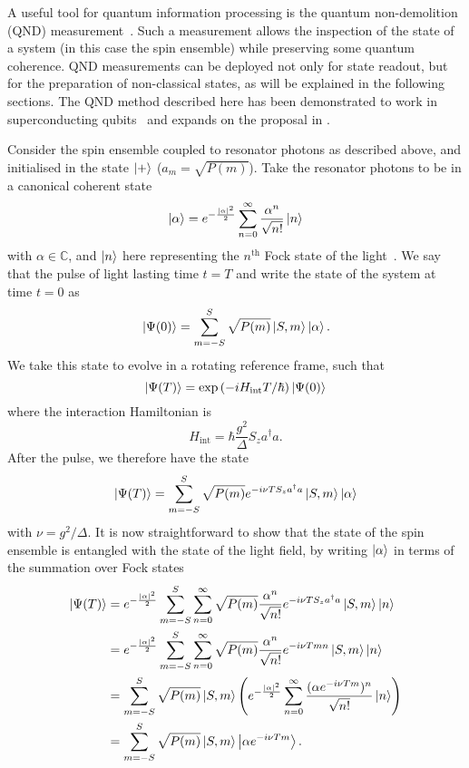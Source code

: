 A useful tool for quantum information processing is the quantum non-demolition
(QND) measurement~\cite{}. Such a measurement allows the inspection of the
state of a system (in this case the spin ensemble) while preserving some
quantum coherence. QND measurements can be deployed not only for state readout,
but for the preparation of non-classical states, as will be explained in the
following sections. The QND method described here has been demonstrated to work
in superconducting qubits~\cite{PhysRevA.69.062320} and expands on the proposal
in \cite{Andre2006}.

Consider the spin ensemble coupled to resonator photons as described above, and
initialised in the state $\ket{+}$ ($a_m = \sqrt{P(m)}$). Take the resonator
photons to be in a canonical coherent state~\cite{Gazeau2009}
%
\begin{equation}
  \ket{\alpha} = e^{-\frac{|\alpha|^2}{2}}\sum_{n=0}^\infty \frac{\alpha^n}{\sqrt{n!}} \ket{n}
\end{equation}
%
with $\alpha\in\mathbb{C}$, and $\ket{n}$ here representing the $n^\text{th}$
Fock state of the light~\cite{agarwal2012}. We say that the pulse of light lasting time
$t=T$ and  write the state of the system at time $t=0$ as
%
\begin{equation}
  \ket{\Psi(0)} = \sum_{m=-S}^S \sqrt{P(m)} \ket{S, m}\ket{\alpha}.
\end{equation}
%
We take this state to evolve in a rotating reference frame, such that
%
\begin{equation}
  \ket{\Psi(T)} = \exp\left(-iH_\text{int}T/\hbar\right)\ket{\Psi(0)}
\end{equation}
%
where the interaction Hamiltonian is
%
\begin{equation}
  H_\text{int} = \hbar \frac{g^2}{\Delta} S_z a^\dagger a.
\end{equation}
%
After the pulse, we therefore have the state
%
\begin{equation}
  \ket{\Psi(T)} = \sum_{m=-S}^S \sqrt{P(m)} e^{-i\nu T S_z
  a^\dagger a} \ket{S, m}\ket{\alpha}
\end{equation}
%
with $\nu = g^2/\Delta$. It is now straightforward to show that
the state of the spin ensemble is entangled with the state of the light field,
by writing $\ket{\alpha}$ in terms of the summation over Fock states
%
\begin{align}
  \ket{\Psi(T)} &= e^{-\frac{|\alpha|^2}{2}}\sum_{m=-S}^S \sum_{n=0}^\infty \sqrt{P(m)}
   \frac{\alpha^n}{\sqrt{n!}} e^{-i\nu T S_z a^\dagger a} \ket{S, m} \ket{n}
   \\
  &= e^{-\frac{|\alpha|^2}{2}}\sum_{m=-S}^S \sum_{n=0}^\infty \sqrt{P(m)}
  \frac{\alpha^n}{\sqrt{n!}} e^{-i\nu Tm n} \ket{S, m} \ket{n} \\
  &= \sum_{m=-S}^S \sqrt{P(m)} \ket{S, m} \left( e^{-\frac{|\alpha|^2}{2}}
  \sum_{n=0}^\infty \frac{(\alpha e^{-i\nu T m})^n}{\sqrt{n!}}\ket{n}\right)
  \\
  &= \sum_{m=-S}^S \sqrt{P(m)} \ket{S, m}\ket{\alpha e^{-i\nu T m}}.
\end{align}

